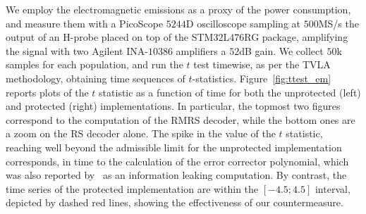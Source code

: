 We employ the electromagnetic emissions as a proxy of the power consumption, 
and measure them with a PicoScope $5244$D oscilloscope sampling at $500$MS/s the 
output of an H-probe placed on top of the STM$32$L$476$RG package, amplifying the
signal with two Agilent INA-$10386$ amplifiers a $52$dB gain.
We collect $50$k samples for each population, and run the $t$ test timewise, 
as per the TVLA~\cite{DBLP:journals/jce/SchneiderM16} methodology, obtaining
time sequences of $t$-statistics. 
Figure~\ref{fig:ttest_em} reports plots of the $t$ statistic as a function of time
for both the unprotected (left) and protected (right) implementations.
In particular, the topmost two figures correspond to the computation of the
RMRS decoder, while the bottom ones are a zoom on the RS decoder alone.
The spike in the value of the $t$ statistic, reaching well beyond the admissible
limit for the unprotected implementation corresponds, in time to the calculation 
of the error corrector polynomial, which was also reported 
by~\cite{schamberger2022power} as an information leaking computation.
By contrast, the time series of the protected implementation are within the $[-4.5;4.5]$ interval, depicted by dashed red lines, showing
the effectiveness of our countermeasure.



